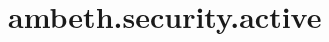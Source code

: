 \section{ambeth.security.active}
\label{configuration:AmbethSecurityActive}
\AvailableInJavaAndCsharp{\TODO}